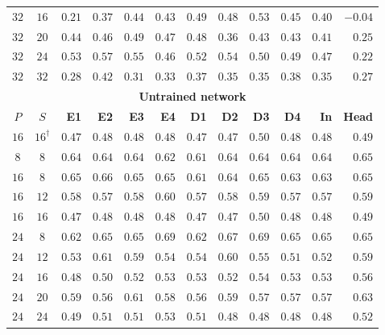\begin{table}[!tbp]
\begin{tabular}{@{}ccrrrrrrrrrr@{}}
        $32$ & $16$ & $0.21$ & $0.37$ & $0.44$ & $0.43$ & $0.49$ & $0.48$ & $0.53$ & $0.45$ & $0.40$ & $-0.04$ \\
        $32$ & $20$ & $0.44$ & $0.46$ & $0.49$ & $0.47$ & $0.48$ & $0.36$ & $0.43$ & $0.43$ & $0.41$ & $0.25$ \\
        $32$ & $24$ & $0.53$ & $0.57$ & $0.55$ & $0.46$ & $0.52$ & $0.54$ & $0.50$ & $0.49$ & $0.47$ & $0.22$ \\
        $32$ & $32$ & $0.28$ & $0.42$ & $0.31$ & $0.33$ & $0.37$ & $0.35$ & $0.35$ & $0.38$ & $0.35$ & $0.27$ \\
        \midrule
        \multicolumn{12}{c}{\textbf{Untrained network}} \\
        \midrule
        \textbf{$P$} & \textbf{$S$} & \textbf{E1} & \textbf{E2} & \textbf{E3} & \textbf{E4} & \textbf{D1} & \textbf{D2} & \textbf{D3} & \textbf{D4} & \textbf{In} & \textbf{Head} \\
        \midrule
        $16$ & $16^{\dagger}$ & $0.47$ & $0.48$ & $0.48$ & $0.48$ & $0.47$ & $0.47$ & $0.50$ & $0.48$ & $0.48$ & $0.49$ \\
        \midrule
        \addlinespace[2pt]
        $8$ & $8$ & $0.64$ & $0.64$ & $0.64$ & $0.62$ & $0.61$ & $0.64$ & $0.64$ & $0.64$ & $0.64$ & $0.65$ \\
        \addlinespace[2pt]
        $16$ & $8$ & $0.65$ & $0.66$ & $0.65$ & $0.65$ & $0.61$ & $0.64$ & $0.65$ & $0.63$ & $0.63$ & $0.65$ \\
        $16$ & $12$ & $0.58$ & $0.57$ & $0.58$ & $0.60$ & $0.57$ & $0.58$ & $0.59$ & $0.57$ & $0.57$ & $0.59$ \\
        $16$ & $16$ & $0.47$ & $0.48$ & $0.48$ & $0.48$ & $0.47$ & $0.47$ & $0.50$ & $0.48$ & $0.48$ & $0.49$ \\
        \addlinespace[2pt]
        $24$ & $8$ & $0.62$ & $0.65$ & $0.65$ & $0.69$ & $0.62$ & $0.67$ & $0.69$ & $0.65$ & $0.65$ & $0.65$ \\
        $24$ & $12$ & $0.53$ & $0.61$ & $0.59$ & $0.54$ & $0.54$ & $0.60$ & $0.55$ & $0.51$ & $0.52$ & $0.59$ \\
        $24$ & $16$ & $0.48$ & $0.50$ & $0.52$ & $0.53$ & $0.53$ & $0.52$ & $0.54$ & $0.53$ & $0.53$ & $0.56$ \\
        $24$ & $20$ & $0.59$ & $0.56$ & $0.61$ & $0.58$ & $0.56$ & $0.59$ & $0.57$ & $0.57$ & $0.57$ & $0.63$ \\
        $24$ & $24$ & $0.49$ & $0.51$ & $0.51$ & $0.53$ & $0.51$ & $0.48$ & $0.48$ & $0.48$ & $0.48$ & $0.52$ \\

\end{tabular}
\end{table}
